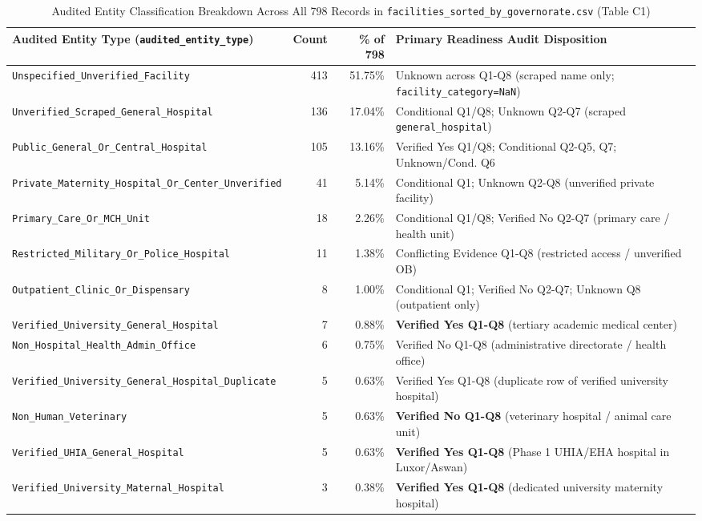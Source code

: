 \documentclass[10pt,a4paper]{article}
\begin{document}
{\footnotesize
\begin{table}[ht!]
\centering
\caption{Audited Entity Classification Breakdown Across All 798 Records in \texttt{facilities\_sorted\_by\_governorate.csv} (Table C1)}
\label{tab:table_c1}
\begin{tabular}{l r r l}
\toprule
\textbf{Audited Entity Type (\texttt{audited\_entity\_type})} & \textbf{Count} & \textbf{\% of 798} & \textbf{Primary Readiness Audit Disposition} \\
\midrule
\texttt{Unspecified\_Unverified\_Facility} & 413 & 51.75\% & Unknown across Q1-Q8 (scraped name only; \texttt{facility\_category=NaN}) \\
\texttt{Unverified\_Scraped\_General\_Hospital} & 136 & 17.04\% & Conditional Q1/Q8; Unknown Q2-Q7 (scraped \texttt{general\_hospital}) \\
\texttt{Public\_General\_Or\_Central\_Hospital} & 105 & 13.16\% & Verified Yes Q1/Q8; Conditional Q2-Q5, Q7; Unknown/Cond. Q6 \\
\texttt{Private\_Maternity\_Hospital\_Or\_Center\_Unverified} & 41 & 5.14\% & Conditional Q1; Unknown Q2-Q8 (unverified private facility) \\
\texttt{Primary\_Care\_Or\_MCH\_Unit} & 18 & 2.26\% & Conditional Q1/Q8; Verified No Q2-Q7 (primary care / health unit) \\
\texttt{Restricted\_Military\_Or\_Police\_Hospital} & 11 & 1.38\% & Conflicting Evidence Q1-Q8 (restricted access / unverified OB) \\
\texttt{Outpatient\_Clinic\_Or\_Dispensary} & 8 & 1.00\% & Conditional Q1; Verified No Q2-Q7; Unknown Q8 (outpatient only) \\
\texttt{Verified\_University\_General\_Hospital} & 7 & 0.88\% & \textbf{Verified Yes Q1-Q8} (tertiary academic medical center) \\
\texttt{Non\_Hospital\_Health\_Admin\_Office} & 6 & 0.75\% & Verified No Q1-Q8 (administrative directorate / health office) \\
\texttt{Verified\_University\_General\_Hospital\_Duplicate} & 5 & 0.63\% & Verified Yes Q1-Q8 (duplicate row of verified university hospital) \\
\texttt{Non\_Human\_Veterinary} & 5 & 0.63\% & \textbf{Verified No Q1-Q8} (veterinary hospital / animal care unit) \\
\texttt{Verified\_UHIA\_General\_Hospital} & 5 & 0.63\% & \textbf{Verified Yes Q1-Q8} (Phase 1 UHIA/EHA hospital in Luxor/Aswan) \\
\texttt{Verified\_University\_Maternal\_Hospital} & 3 & 0.38\% & \textbf{Verified Yes Q1-Q8} (dedicated university maternity hospital) \\

\end{tabular}
\end{table}}
\end{document}
